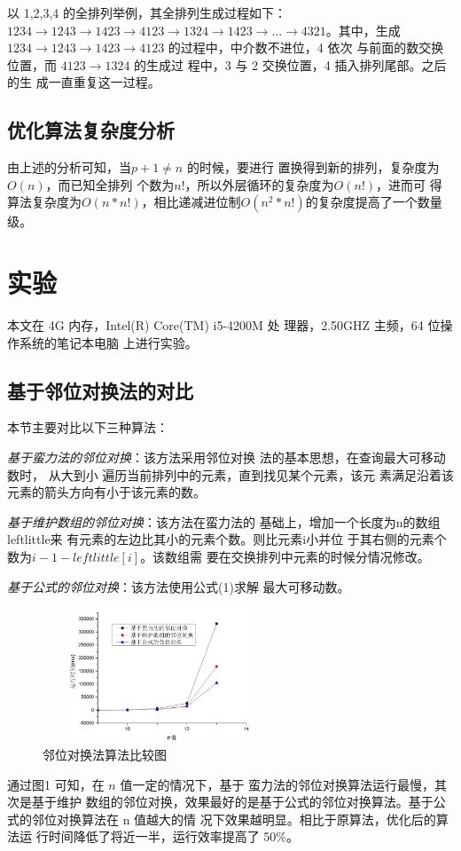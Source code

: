 \documentclass[6pt, twocolumn]{ctexart}
\begin{document}
以 1,2,3,4 的全排列举例，其全排列生成过程如下：$1 2 3 4 → 1 2 4 3 → 1 4 2 3 → 4 1 2 3 → 1 3 2 4 → 1 4 2 3 → …→ 4 3 2 1$。其中，生成 $1 2 3 4 → 1 2 4 3 → 1 4 2 3 →4 1 2 3$ 的过程中，中介数不进位，4 依次 与前面的数交换位置，而 $4 1 2 3 → 1 3 2 4$ 的生成过 程中，3 与 2 交换位置，4 插入排列尾部。之后的生 成一直重复这一过程。
\subsection{优化算法复杂度分析}
由上述的分析可知，当$p+1\ne n$ 的时候，要进行 置换得到新的排列，复杂度为$O(n)$，而已知全排列 个数为$n!$，所以外层循环的复杂度为$O(n!)$，进而可 得算法复杂度为$O(n * n!)$，相比递减进位制$O(n^2*n!)$的复杂度提高了一个数量级。
\section{实验}
本文在 4G 内存，Intel(R) Core(TM) i5-4200M 处 理器，2.50GHZ 主频，64 位操作系统的笔记本电脑 上进行实验。
\subsection{基于邻位对换法的对比}
本节主要对比以下三种算法：

\emph{基于蛮力法的邻位对换}：该方法采用邻位对换 法的基本思想，在查询最大可移动数时， 从大到小 遍历当前排列中的元素，直到找见某个元素，该元 素满足沿着该元素的箭头方向有小于该元素的数。

\emph{基于维护数组的邻位对换}：该方法在蛮力法的 基础上，增加一个长度为n的数组leftlittle来 有元素的左边比其小的元素个数。则比元素i小并位 于其右侧的元素个数为$i-1-leftlittle[i]$。该数组需 要在交换排列中元素的时候分情况修改。

\emph{基于公式的邻位对换}：该方法使用公式(1)求解 最大可移动数。
\begin{figure}
\centering	

\caption{邻位对换法算法比较图}
\includegraphics[width=7cm, height=4cm]{1.png}	
\end{figure}

通过图1 可知，在 $n$ 值一定的情况下，基于 蛮力法的邻位对换算法运行最慢，其次是基于维护 数组的邻位对换，效果最好的是基于公式的邻位对换算法。基于公式的邻位对换算法在 n 值越大的情 况下效果越明显。相比于原算法，优化后的算法运 行时间降低了将近一半，运行效率提高了 50\%。
\end{document}
